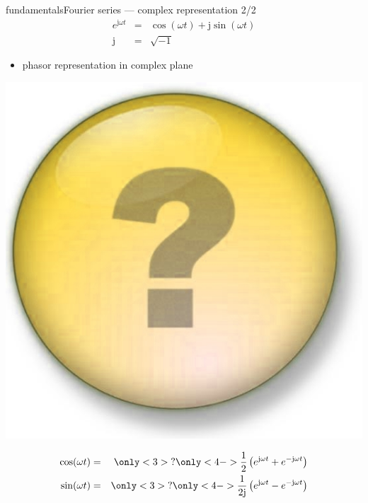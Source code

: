 \begin{frame}{fundamentals}{Fourier series --- complex representation 2/2}
    \begin{eqnarray}
        e^{\mathrm{j}\omega t} &=& \cos(\omega t) + \mathrm{j}\sin(\omega t)\nonumber\\
        \mathrm{j} &=& \sqrt{-1}\nonumber
    \end{eqnarray}
    \pause
    \begin{itemize}
        \item   phasor representation in complex plane
    \end{itemize}
    \pause
		\begin{flushright}
			 \includegraphics[scale=.08]{Graph/question-mark}
		\end{flushright}
    \begin{eqnarray}
        \cos(\omega t) &=& \only<3>{?}\only<4->{\frac{1}{2}\left(e^{\mathrm{j}\omega t} + e^{-\mathrm{j}\omega t}\right)}\nonumber\\
        \sin(\omega t) &=& \only<3>{?}\only<4->{\frac{1}{2\mathrm{j}}\left(e^{\mathrm{j}\omega t} - e^{-\mathrm{j}\omega t}\right)}\nonumber
    \end{eqnarray}
\end{frame}
